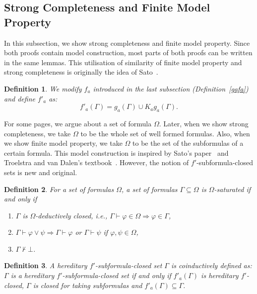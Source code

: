 \documentclass[doctor]{iscs-thesis}
\newtheorem{definition}{Definition}
\begin{document}
\subsection{Strong Completeness and Finite Model Property}

In this subsection, we show strong completeness and finite model property.
Since both proofs contain model construction,
most parts of both proofs can be written in the same lemmas.
 This utilisation of similarity of finite model property and strong completeness 
is originally the idea of
Sato~\cite{sato13study}.

\begin{definition}
We modify $f_a$ introduced in the last subsection (Definition~\ref{gafa}) and define $f'_a$ as:
 \[
  f'_a(\Gamma) = g_a(\Gamma) \cup K_ag_a(\Gamma).
 \]
\end{definition}

For some pages, we argue about a
set of formula $\Omega$. Later, when we show
strong completeness, we take $\Omega$ to be the whole set of well formed formulas.  Also,
when we show finite model property, we take $\Omega$ to be the set of the subformulas of a
certain formula.  This model construction is inspired by
Sato's paper~\cite{sato13study}
 and Troelstra and van Dalen's textbook~\cite{troelstra1988constructivism}.
 However, the notion of $f'$-subformula-closed sets is new and original.

\begin{definition}
\label{saturated-set}
 For a set of formulas $\Omega$, 
 a set of formulas $\Gamma\subseteq\Omega$ is \textit{$\Omega$-saturated} if and only if
\begin{enumerate}
 \item $\Gamma$ is $\Omega$-deductively closed, i.e., $\Gamma\vdash\varphi\in
       \Omega\Rightarrow
       \varphi\in\Gamma$,
 \item $\Gamma\vdash\varphi\vee\psi \Rightarrow \Gamma\vdash\varphi$ or $\Gamma\vdash\psi$
       if $\varphi,\psi\in\Omega$,
 \item $\Gamma\not\vdash\bot$.
\end{enumerate}
\end{definition}

\begin{definition}
 A hereditary $f'$-subformula-closed set $\Gamma$ is coinductively defined as:
 $\Gamma$ is a hereditary $f'$-subformula-closed set if and only
 if $f'_a(\Gamma)$ is hereditary $f'$-closed, $\Gamma$ is closed for taking subformulas and 
$f'_a(\Gamma)\subseteq \Gamma$.
\end{definition}
\end{document}
